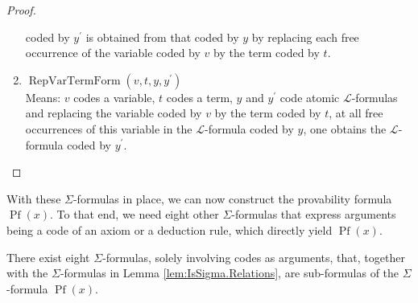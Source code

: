 \begin{proof}
\begin{enumerate}
        coded by $y^\prime$ is obtained from that coded by $y$ by replacing each free occurrence of 
        the variable coded by $v$ by the term coded by $t$.
        \item $\operatorname{RepVarTermForm}(v, t, y, y^\prime)$\\
        Means: $v$ codes a variable, $t$ codes a term, $y$ and $y^\prime$ code atomic 
        $\mathcal{L}$-formulas and replacing the variable coded by $v$ by the term coded by $t$, 
        at all free occurrences of this variable in the $\mathcal{L}$-formula coded by $y$, 
        one obtains the $\mathcal{L}$-formula coded by $y^\prime$.
    \end{enumerate}
\end{proof}

With these $\Sigma$-formulas in place, 
we can now construct the provability formula $\operatorname{Pf}(x)$.
To that end, we need eight other $\Sigma$-formulas that express arguments being 
a code of an axiom or a deduction rule, which directly yield $\operatorname{Pf}(x)$.

\begin{lemma}
    \label{lem:IsSigma.Ax+...+IsSigma.Pf}
    There exist eight $\Sigma$-formulas, solely involving codes as arguments, that, together with
    the $\Sigma$-formulas in Lemma \ref{lem:IsSigma.Relations}, are sub-formulas of
    the $\Sigma$-formula $\operatorname{Pf}(x)$.
\end{lemma}

